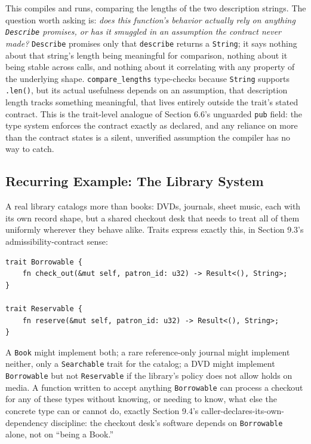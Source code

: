\documentclass[11pt]{book}
\begin{document}
This compiles and runs, comparing the lengths of the two description strings. The question worth asking is: \emph{does this function's behavior actually rely on anything \texttt{Describe} promises, or has it smuggled in an assumption the contract never made?} \texttt{Describe} promises only that \texttt{describe} returns a \texttt{String}; it says nothing about that string's length being meaningful for comparison, nothing about it being stable across calls, and nothing about it correlating with any property of the underlying shape. \texttt{compare\_lengths} type-checks because \texttt{String} supports \texttt{.len()}, but its actual usefulness depends on an assumption, that description length tracks something meaningful, that lives entirely outside the trait's stated contract. This is the trait-level analogue of Section 6.6's unguarded \texttt{pub} field: the type system enforces the contract exactly as declared, and any reliance on more than the contract states is a silent, unverified assumption the compiler has no way to catch.

\subsection*{Recurring Example: The Library System}

A real library catalogs more than books: DVDs, journals, sheet music, each with its own record shape, but a shared checkout desk that needs to treat all of them uniformly wherever they behave alike. Traits express exactly this, in Section 9.3's admissibility-contract sense:

\begin{lstlisting}
trait Borrowable {
    fn check_out(&mut self, patron_id: u32) -> Result<(), String>;
}

trait Reservable {
    fn reserve(&mut self, patron_id: u32) -> Result<(), String>;
}
\end{lstlisting}

A \texttt{Book} might implement both; a rare reference-only journal might implement neither, only a \texttt{Searchable} trait for the catalog; a DVD might implement \texttt{Borrowable} but not \texttt{Reservable} if the library's policy does not allow holds on media. A function written to accept anything \texttt{Borrowable} can process a checkout for any of these types without knowing, or needing to know, what else the concrete type can or cannot do, exactly Section 9.4's caller-declares-its-own-dependency discipline: the checkout desk's software depends on \texttt{Borrowable} alone, not on ``being a Book.''
\end{document}
